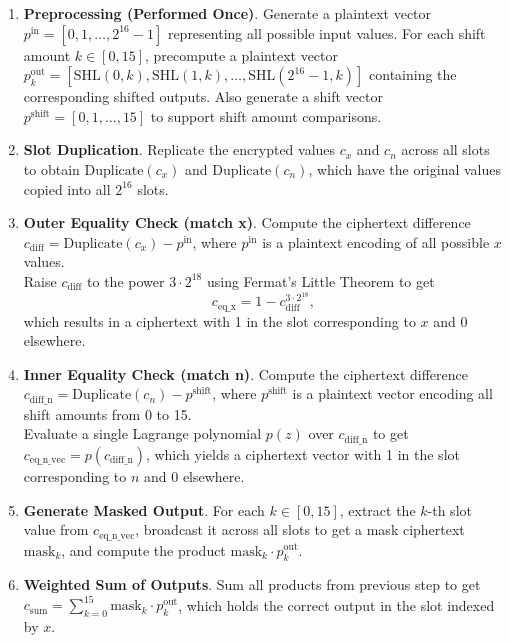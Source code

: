 \documentclass[article]{iacrtrans}
\begin{document}
\begin{enumerate}  
    \item \textbf{Preprocessing (Performed Once)}. Generate a plaintext vector $p^{\text{in}} = [0, 1, \dots, 2^{16} - 1]$ representing all possible input values. For each shift amount $k \in [0, 15]$, precompute a plaintext vector $p_k^{\text{out}} = [\text{SHL}(0, k), \text{SHL}(1, k), \dots, \text{SHL}(2^{16} - 1, k)]$ containing the corresponding shifted outputs. Also generate a shift vector $p^{\text{shift}} = [0, 1, \dots, 15]$ to support shift amount comparisons.
    
    \item \textbf{Slot Duplication}. Replicate the encrypted values $c_x$ and $c_n$ across all slots to obtain $\text{Duplicate}(c_x)$ and $\text{Duplicate}(c_n)$, which have the original values copied into all $2^{16}$ slots.
    
    \item \textbf{Outer Equality Check (match x)}. Compute the ciphertext difference $c_{\text{diff}} = \text{Duplicate}(c_x) - p^{\text{in}}$, where $p^{\text{in}}$ is a plaintext encoding of all possible $x$ values.\\
    Raise $c_{\text{diff}}$ to the power $3 \cdot 2^{18}$ using Fermat’s Little Theorem to get $$c_{\text{eq\_x}} = 1 - c_{\text{diff}}^{3 \cdot 2^{18}},$$ which results in a ciphertext with 1 in the slot corresponding to $x$ and 0 elsewhere.
    
    \item \textbf{Inner Equality Check (match n)}. Compute the ciphertext difference $c_{\text{diff\_n}} = \text{Duplicate}(c_n) - p^{\text{shift}}$, where $p^{\text{shift}}$ is a plaintext vector encoding all shift amounts from 0 to 15.\\ 
    Evaluate a single Lagrange polynomial $p(z)$ over $c_{\text{diff\_n}}$ to get $c_{\text{eq\_n\_vec}} = p(c_{\text{diff\_n}})$, which yields a ciphertext vector with 1 in the slot corresponding to $n$ and 0 elsewhere.\\
    
    \item \textbf{Generate Masked Output}. For each $k \in [0, 15]$, extract the $k$-th slot value from $c_{\text{eq\_n\_vec}}$, broadcast it across all slots to get a mask ciphertext $\text{mask}_k$, and compute the product $\text{mask}_k \cdot p_k^{\text{out}}$.
    
    \item \textbf{Weighted Sum of Outputs}. Sum all products from previous step to get $c_{\text{sum}} = \sum_{k=0}^{15} \text{mask}_k \cdot p_k^{\text{out}}$, which holds the correct output in the slot indexed by $x$.
    

\end{enumerate}
\end{document}
